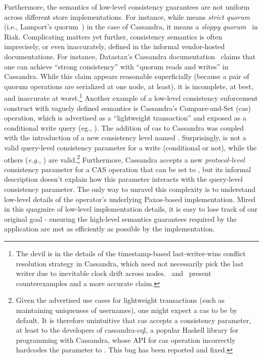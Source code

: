 Furthermore, the semantics of low-level consistency guarantees are not
uniform across different store implementations. For instance, while
 means \emph{strict quorum} (i.e., Lamport's
quorum~\cite{LamportQuorum}) in the case of Cassandra, it means a
\emph{sloppy quorum}~\cite{Dynamo} in Riak. Complicating matters yet
further, consistency semantics is often imprecisely, or even
inaccurately, defined in the informal vendor-hosted documentations.
For instance, Datastax's Cassandra documentation~\cite{dxlwt} claims
that one can achieve ``strong consistency'' with ``quorum reads and
writes'' in Cassandra.  While this claim appears reasonable
superficially (because a pair of quorum operations are serialized at
one node, at least), it is incomplete, at best, and inaccurate at
worst.\footnote{The devil is in the details of the timestamp-based
  last-writer-wins conflict resolution strategy in Cassandra, which
  need not necessarily pick the last writer due to inevitable clock
  drift across nodes.~\cite{TyconCassandra} and~\cite{JepsenCassandra}
  present counterexamples and a more accurate claim.}  Another example
of a low-level consistency enforcement construct with vaguely defined
semantics is Cassandra's Compare-and-Set ({\sc cas}) operation, which
is advertised as a ``lightweight transaction'' and exposed as a
conditional write query (eg., ).  The addition of {\sc cas} to Cassandra was coupled with
the introduction of a new consistency level named .
Surprisingly,  is not a valid query-level consistency
parameter for a write (conditional or not), while the others
(\emph{e.g.}, ) are valid.\footnote{Given the advertised use
  cases for lightweight transactions (such as maintaining uniqueness
  of usernames), one might expect a {\sc cas} to be  by
  default. It is therefore unintuitive that {\sc cas} accepts a
  consistency parameter, at least to the developers of cassandra-cql,
  a popular Haskell library for programming with Cassandra, whose API
  for {\sc cas} operation incorrectly hardcodes the parameter to
  . This bug has been reported and fixed.}  Furthermore,
Cassandra accepts a new \emph{protocol-level} consistency parameter
for a {\sc CAS} operation that can be set to , but its
informal description doesn't explain how this parameter interacts with
the query-level consistency parameter.  The only way to unravel this
complexity is to understand low-level details of the operator's
underlying Paxos-based implementation.  Mired in this quagmire of
low-level implementation details, it is easy to lose track of our
original goal - ensuring the high-level semantics guarantees required
by the application are met as efficiently as possible by the
implementation.

